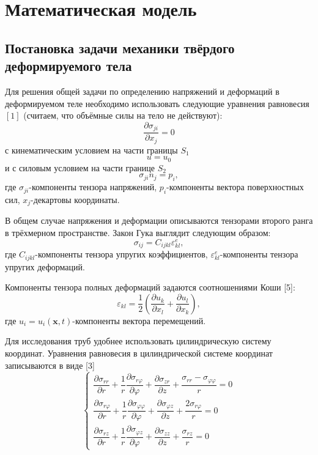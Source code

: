\documentclass[a4paper,14pt]{extarticle}
\begin{document}
\newpage
\section{Математическая модель}
\subsection{Постановка задачи механики твёрдого деформируемого тела}

Для решения общей задачи по определению напряжений и деформаций в деформируемом теле необходимо использовать следующие уравнения равновесия $\left[1\right]$ (считаем, что объёмные силы на тело не действуют):
\begin{equation}\label{EquationEquilGeneral}
\frac{\partial \sigma_{ji}}{\partial x_{j}}=0
\end{equation}
с кинематическим условием на части границы $S_{1}$
\begin{equation}
u=u_{0}
\end{equation}
и с силовым условием на части границе $S_{2}$
\begin{equation*}
\sigma_{ji} n_{j}=p_{i},
\end{equation*}
где $\sigma_{ji}$-компоненты тензора напряжений, $p_i$-компоненты вектора поверхностных сил, $x_{j}$-декартовы координаты. 
 
В общем случае напряжения и деформации описываются тензорами второго ранга в трёхмерном пространстве. Закон Гука выглядит следующим образом:
\begin{equation}\label{GukGeneral}
\sigma_{ij}=C_{ijkl}\varepsilon^{e}_{kl},
\end{equation}
где $C_{ijkl}$-компоненты тензора упругих коэффициентов, $\varepsilon^{e}_{kl}$-компоненты тензора упругих деформаций.
	
Компоненты тензора полных деформаций задаются соотношениями Коши [5]:
\begin{equation}\label{KoshiGeneral}
\varepsilon_{kl}=\frac{1}{2}(\frac{\partial u_k}{\partial x_l}+\frac{\partial u_l}{\partial x_k}),
\end{equation}
где $u_i=u_i(\mathbf{x},t)$-компоненты вектора перемещений.

Для исследования труб удобнее использовать цилиндрическую систему координат. Уравнения равновесия в цилиндрической системе координат записываются в виде [3]
\begin{equation} \label{CSK}
\begin{cases}
\dfrac{\partial \sigma_{rr}}{\partial r}+\dfrac{1}{r}\dfrac{\partial \sigma_{r\varphi}}{\partial \varphi}+\dfrac{\partial \sigma_{zr}}{\partial z}+\dfrac{\sigma_{rr}-\sigma_{\varphi\varphi}}{r}=0 \\
\dfrac{\partial \sigma_{r\varphi}}{\partial r}+\dfrac{1}{r}\dfrac{\partial \sigma_{\varphi\varphi}}{\partial \varphi}+\dfrac{\partial \sigma_{\varphi z}}{\partial z}+\dfrac{2\sigma_{r\varphi}}{r}=0 \\
\dfrac{\partial \sigma_{rz}}{\partial r}+\dfrac{1}{r}\dfrac{\partial \sigma_{\varphi z}}{\partial \varphi}+\dfrac{\partial \sigma_{zz}}{\partial z}+\dfrac{\sigma_{rz}}{r}=0
\end{cases}
\end{equation}
\end{document}
